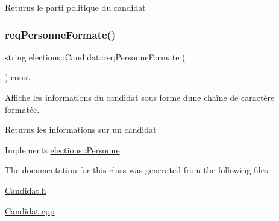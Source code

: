\begin{DoxyReturn}{Returns}
le parti politique du candidat 
\end{DoxyReturn}
\mbox{\label{classelections_1_1Candidat_a4b614df7326d8aacdec158b77a6ec406}} 
\subsubsection{\texorpdfstring{req\+Personne\+Formate()}{reqPersonneFormate()}}
{\footnotesize\ttfamily string elections\+::\+Candidat\+::req\+Personne\+Formate (\begin{DoxyParamCaption}{ }\end{DoxyParamCaption}) const\hspace{0.3cm}{\ttfamily [virtual]}}



Affiche les informations du candidat sous forme d\textquotesingle{}une chaîne de caractère formatée. 

\begin{DoxyReturn}{Returns}
les informations sur un candidat 
\end{DoxyReturn}


Implements \hyperlink{classelections_1_1Personne_aac1232e61b7cb9743bafba9280041d35}{elections\+::\+Personne}.



The documentation for this class was generated from the following files\+:\begin{DoxyCompactItemize}
\item 
\hyperlink{Candidat_8h}{Candidat.\+h}\item 
\hyperlink{Candidat_8cpp}{Candidat.\+cpp}\end{DoxyCompactItemize}
